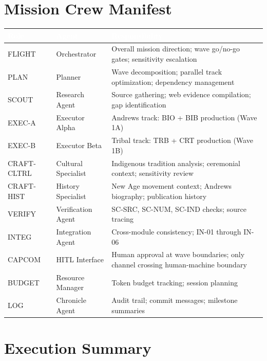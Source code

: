 \documentclass[11pt,letterpaper]{article}
\newcommand{\tableheader}[1]{\textbf{\sffamily\textcolor{white}{#1}}}
\begin{document}
\section{Mission Crew Manifest}

\begin{center}
\begin{tabularx}{\textwidth}{L{2cm}L{3cm}X}
\toprule
{}
\tableheader{Role} & \tableheader{Agent} & \tableheader{Responsibility} \\
\midrule
FLIGHT & Orchestrator & Overall mission direction; wave go/no-go gates; sensitivity escalation \\
PLAN & Planner & Wave decomposition; parallel track optimization; dependency management \\
SCOUT & Research Agent & Source gathering; web evidence compilation; gap identification \\
EXEC-A & Executor Alpha & Andrews track: BIO + BIB production (Wave 1A) \\
EXEC-B & Executor Beta & Tribal track: TRB + CRT production (Wave 1B) \\
CRAFT-CLTRL & Cultural Specialist & Indigenous tradition analysis; ceremonial context; sensitivity review \\
CRAFT-HIST & History Specialist & New Age movement context; Andrews biography; publication history \\
VERIFY & Verification Agent & SC-SRC, SC-NUM, SC-IND checks; source tracing \\
INTEG & Integration Agent & Cross-module consistency; IN-01 through IN-06 \\
CAPCOM & HITL Interface & Human approval at wave boundaries; only channel crossing human-machine boundary \\
BUDGET & Resource Manager & Token budget tracking; session planning \\
LOG & Chronicle Agent & Audit trail; commit messages; milestone summaries \\
\bottomrule
\end{tabularx}
\end{center}

\section{Execution Summary}
\end{document}
